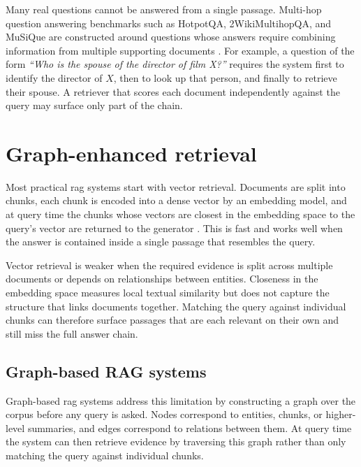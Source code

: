 \documentclass[english, bibtex]{kththesis}               %
\numberwithin{listing}{chapter}
\begin{document}
Many real questions cannot be answered from a single passage. Multi-hop question answering benchmarks such as HotpotQA, 2WikiMultihopQA, and MuSiQue are constructed around questions whose answers require combining information from multiple supporting documents \cite{ho2020twowiki,yang2018hotpotqa,trivedi2022musique}. For example, a question of the form \emph{``Who is the spouse of the director of film X?''} requires the system first to identify the director of \(X\), then to look up that person, and finally to retrieve their spouse. A retriever that scores each document independently against the query may surface only part of the chain.

\section{Graph-enhanced retrieval}
\label{sec:backgroundHybridGraph}

Most practical \gls{rag} systems start with vector retrieval. Documents are split into chunks, each chunk is encoded into a dense vector by an embedding model, and at query time the chunks whose vectors are closest in the embedding space to the query's vector are returned to the generator \cite{lewis2020rag,karpukhin2020dpr}. This is fast and works well when the answer is contained inside a single passage that resembles the query.

Vector retrieval is weaker when the required evidence is split across multiple documents or depends on relationships between entities. Closeness in the embedding space measures local textual similarity but does not capture the structure that links documents together. Matching the query against individual chunks can therefore surface passages that are each relevant on their own and still miss the full answer chain.

\subsection{Graph-based RAG systems}
\label{sec:backgroundGraphSystems}

Graph-based \gls{rag} systems address this limitation by constructing a graph over the corpus before any query is asked. Nodes correspond to entities, chunks, or higher-level summaries, and edges correspond to relations between them. At query time the system can then retrieve evidence by traversing this graph rather than only matching the query against individual chunks.
\end{document}
